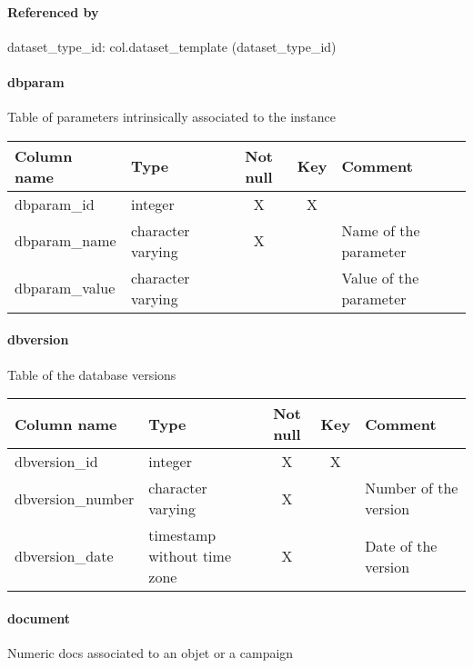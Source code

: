 \paragraph{Referenced by}
dataset\_type\_id: col.dataset\_template (dataset\_type\_id)

\paragraph{dbparam}
Table of parameters intrinsically associated to the instance

\begin{tabular}{|l| p{2cm}|c|c| p{5cm}|}
\hline
Column name & Type & Not null & Key & Comment \\
\hline
dbparam\_id & integer & X & X & \\
dbparam\_name & character varying & X &  & Name of the parameter\\
dbparam\_value & character varying &  &  & Value of the parameter\\
\hline
\end{tabular}
\paragraph{dbversion}
Table of the database versions

\begin{tabular}{|l| p{2cm}|c|c| p{5cm}|}
\hline
Column name & Type & Not null & Key & Comment \\
\hline
dbversion\_id & integer & X & X & \\
dbversion\_number & character varying & X &  & Number of the version\\
dbversion\_date & timestamp without time zone & X &  & Date of the version\\
\hline
\end{tabular}
\paragraph{document}
Numeric docs associated to an objet or a campaign

